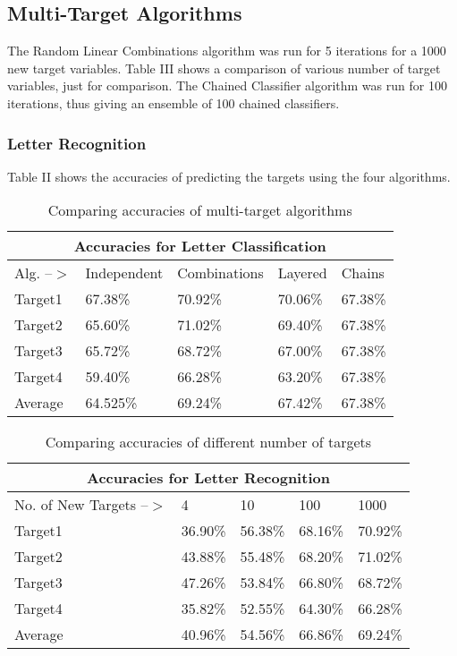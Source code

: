 \documentclass[letterpaper, 11 pt, conference]{IEEEtran}  %
\begin{document}
\vspace{3mm}

\subsection{\textbf{Multi-Target Algorithms}}

The Random Linear Combinations algorithm was run for 5 iterations for a 1000 new target variables.  Table III shows a comparison of various number of target variables, just for comparison. The Chained Classifier algorithm was run for 100 iterations, thus giving an ensemble of 100 chained classifiers.
\vspace{3mm}
\subsubsection{Letter Recognition}

Table II shows the accuracies of predicting the targets using the four algorithms.

\begin{table}[h]
\caption{Comparing accuracies of multi-target algorithms}
\centering
\begin{tabular}{ |p{1.2cm}|p{1.5cm}|p{1.7cm}|p{1cm}|p{1.25cm}|}
	\hline
	\multicolumn{5}{|c|}{Accuracies for Letter Classification} \\
	\hline
	Alg. --$>$& Independent& Combinations  & Layered  & Chains \\
	\hline
	Target1 & 67.38\% & 70.92\% & 70.06\% & 67.38\% \\
	Target2 & 65.60\% & 71.02\% & 69.40\% & 67.38\% \\
	Target3 & 65.72\% & 68.72\% & 67.00\% & 67.38\% \\
	Target4 & 59.40\% & 66.28\% & 63.20\% & 67.38\% \\
	\hline
	Average & 64.525\% & 69.24\% & 67.42\% & 67.38\% \\
	\hline
\end{tabular}
\end{table}

\begin{table}[h]
	\caption{Comparing accuracies of different number of targets}
	\centering
	\begin{tabular}{ |p{1.5cm}|p{1.2cm}|p{1.2cm}|p{1.2cm}|p{1.2cm}|}
		\hline
		\multicolumn{5}{|c|}{Accuracies for Letter Recognition} \\
		\hline
		No. of New Targets --$>$& 4 & 10  & 100 & 1000 \\
		\hline
		Target1 & 36.90\% & 56.38\% & 68.16\% & 70.92\% \\
		Target2 & 43.88\% & 55.48\% & 68.20\% & 71.02\% \\
		Target3 & 47.26\% & 53.84\% & 66.80\% & 68.72\% \\
		Target4 & 35.82\% & 52.55\% & 64.30\% & 66.28\% \\
		\hline
		Average & 40.96\% & 54.56\% & 66.86\% & 69.24\% \\
		\hline
	\end{tabular}
\end{table}
\end{document}
